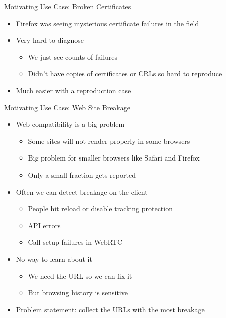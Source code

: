 \documentclass[helvetica]{beamer}
\begin{document}
\begin{frame}{Motivating Use Case: Broken Certificates}
  \begin{itemize}
  \item Firefox was seeing mysterious certificate failures in the
    field
  \item Very hard to diagnose
    \begin{itemize}
    \item We just see counts of failures      
    \item Didn't have copies of certificates or CRLs so hard to reproduce      
    \end{itemize}

  \item Much easier with a reproduction case
  \end{itemize}

\end{frame}


\begin{frame}{Motivating Use Case: Web Site Breakage}

  \begin{itemize}
  \item Web compatibility is a big problem
    \begin{itemize}
    \item Some sites will not render properly in some browsers
    \item Big problem for smaller browsers like Safari and Firefox
    \item Only a small fraction gets reported      
    \end{itemize}
    
  \item Often we can detect breakage on the client
    \begin{itemize}
    \item People hit reload or disable tracking protection
    \item API errors
    \item Call setup failures in WebRTC
    \end{itemize}

  \item No way to learn about it
    \begin{itemize}
    \item We need the URL so we can fix it
    \item But browsing history is sensitive      
    \end{itemize}

  \item Problem statement: collect the URLs with the most breakage
  \end{itemize}
\end{frame}
\end{document}
